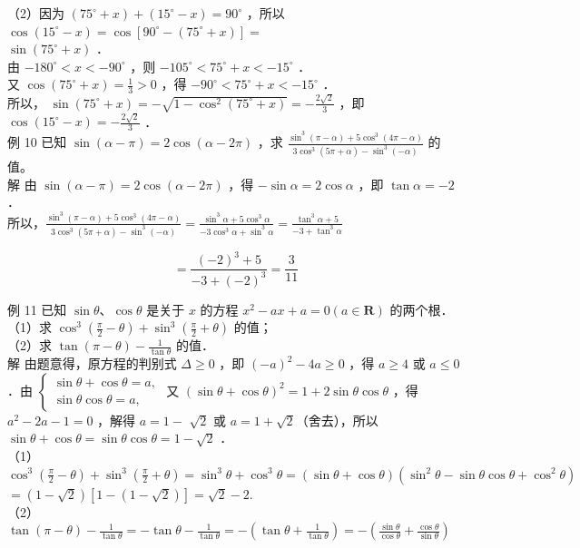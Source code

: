 \documentclass[10pt]{article}
\begin{document}
（2）因为 \(\left(75^{\circ}+x\right)+\left(15^{\circ}-x\right)=90^{\circ}\) ，所以 \(\cos \left(15^{\circ}-x\right)=\cos \left[90^{\circ}-\left(75^{\circ}+x\right)\right]=\)\\
\(\sin \left(75^{\circ}+x\right)\) ．\\
由 \(-180^{\circ}<x<-90^{\circ}\) ，则 \(-105^{\circ}<75^{\circ}+x<-15^{\circ}\) ．\\
又 \(\cos \left(75^{\circ}+x\right)=\frac{1}{3}>0\) ，得 \(-90^{\circ}<75^{\circ}+x<-15^{\circ}\) ．\\
所以， \(\sin \left(75^{\circ}+x\right)=-\sqrt{1-\cos ^{2}\left(75^{\circ}+x\right)}=-\frac{2 \sqrt{2}}{3}\) ，即 \(\cos \left(15^{\circ}-x\right)=-\frac{2 \sqrt{2}}{3}\) ．\\
例 10 已知 \(\sin (\alpha-\pi)=2 \cos (\alpha-2 \pi)\) ，求 \(\frac{\sin ^{3}(\pi-\alpha)+5 \cos ^{3}(4 \pi-\alpha)}{3 \cos ^{3}(5 \pi+\alpha)-\sin ^{3}(-\alpha)}\) 的值。\\
解 由 \(\sin (\alpha-\pi)=2 \cos (\alpha-2 \pi)\) ，得 \(-\sin \alpha=2 \cos \alpha\) ，即 \(\tan \alpha=-2\) ．\\
所以，\(\frac{\sin ^{3}(\pi-\alpha)+5 \cos ^{3}(4 \pi-\alpha)}{3 \cos ^{3}(5 \pi+\alpha)-\sin ^{3}(-\alpha)}=\frac{\sin ^{3} \alpha+5 \cos ^{3} \alpha}{-3 \cos ^{3} \alpha+\sin ^{3} \alpha}=\frac{\tan ^{3} \alpha+5}{-3+\tan ^{3} \alpha}\)

\[
=\frac{(-2)^{3}+5}{-3+(-2)^{3}}=\frac{3}{11}
\]

例 11 已知 \(\sin \theta 、 \cos \theta\) 是关于 \(x\) 的方程 \(x^{2}-a x+a=0(a \in \mathbf{R})\) 的两个根．\\
（1）求 \(\cos ^{3}\left(\frac{\pi}{2}-\theta\right)+\sin ^{3}\left(\frac{\pi}{2}+\theta\right)\) 的值；\\
（2）求 \(\tan (\pi-\theta)-\frac{1}{\tan \theta}\) 的值．\\
解 由题意得，原方程的判别式 \(\Delta \geqslant 0\) ，即 \((-a)^{2}-4 a \geqslant 0\) ，得 \(a \geqslant 4\) 或 \(a \leqslant 0\) ．由 \(\left\{\begin{array}{l}\sin \theta+\cos \theta=a, \\ \sin \theta \cos \theta=a,\end{array}\right.\) 又 \((\sin \theta+\cos \theta)^{2}=1+2 \sin \theta \cos \theta\) ，得 \(a^{2}-2 a-1=0\) ，解得 \(a=1-\) \(\sqrt{2}\) 或 \(a=1+\sqrt{2}\)（舍去），所以 \(\sin \theta+\cos \theta=\sin \theta \cos \theta=1-\sqrt{2}\) ．\\
（1） \(\cos ^{3}\left(\frac{\pi}{2}-\theta\right)+\sin ^{3}\left(\frac{\pi}{2}+\theta\right)=\sin ^{3} \theta+\cos ^{3} \theta=(\sin \theta+\cos \theta)\left(\sin ^{2} \theta-\sin \theta \cos \theta+\cos ^{2} \theta\right)\) \(=(1-\sqrt{2})[1-(1-\sqrt{2})]=\sqrt{2}-2\).\\
（2） \(\tan (\pi-\theta)-\frac{1}{\tan \theta}=-\tan \theta-\frac{1}{\tan \theta}=-\left(\tan \theta+\frac{1}{\tan \theta}\right)=-\left(\frac{\sin \theta}{\cos \theta}+\frac{\cos \theta}{\sin \theta}\right)\)
\end{document}
